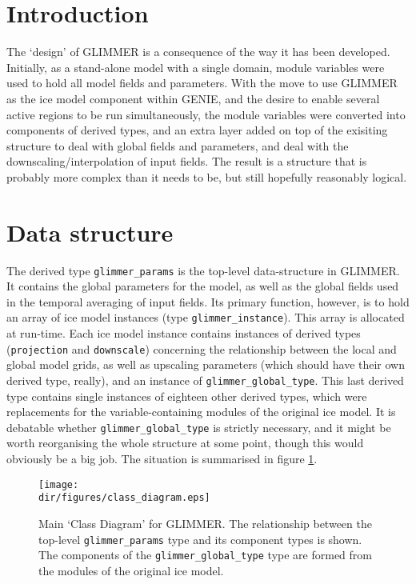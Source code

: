 \section{Introduction}

The `design' of GLIMMER is a consequence of the way it has been
developed. Initially, as a stand-alone model with a single domain, module
variables were used to hold all model fields and parameters. With the move to
use GLIMMER as the ice model component within GENIE, and the desire to enable
several active regions to be run simultaneously, the module variables were
converted into components of derived types, and an extra layer added on top of
the exisiting structure to deal with global fields and parameters, and deal
with the downscaling/interpolation of input fields. The result is a structure
that is probably more complex than it needs to be, but still hopefully
reasonably logical.



\section{Data structure}

The derived type \texttt{glimmer\_params} is the top-level data-structure in
GLIMMER. It contains the global parameters for the model, as well as the
global fields used in the temporal averaging of input fields. Its primary
function, however, is to hold an array of ice model instances (type
\texttt{glimmer\_instance}). This array is allocated at run-time. Each ice
model instance contains instances of derived types (\texttt{projection} and
\texttt{downscale}) concerning the relationship between the local and global
model grids, as well as upscaling parameters (which should have their own
derived type, really), and an instance of \texttt{glimmer\_global\_type}. This
last derived type contains single instances of eighteen other derived types,
which were replacements for the variable-containing modules of the original
ice model. It is debatable whether \texttt{glimmer\_global\_type} is strictly necessary,
and it might be worth reorganising the whole structure at some point, though
this would obviously be a big job. The situation is summarised in figure
\ref{main_class_diagram}.

\begin{figure}
\centering
\texttt{[image: \\dir/figures/class\_diagram.eps]}
\caption{Main `Class Diagram' for GLIMMER. The relationship between the top-level
  \texttt{glimmer\_params} type and its component types is shown. The
  components of the \texttt{glimmer\_global\_type} type are formed from the
  modules of the original ice model.}
\label{main_class_diagram}
\end{figure}



